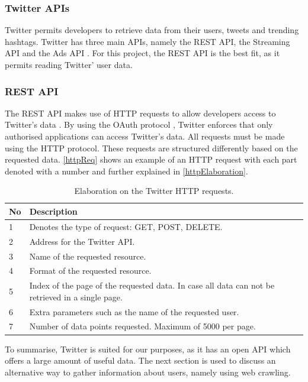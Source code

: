 \subsubsection{Twitter \acp{API}} \label{sub:twitterapi}
Twitter permits developers to retrieve data from their users, tweets and
trending hashtags. Twitter has three main \acp{API}, namely the \ac{REST}
\ac{API}, the Streaming \ac{API} and the Ads \ac{API} \citep{TwitterDevDocs}.
For this project, the \ac{REST} \ac{API} is the best fit, as it permits reading
Twitter' user data. 

\subsubsection{REST API}
The \ac{REST} \ac{API} makes use of \ac{HTTP} requests to allow developers
access to Twitter's data \citep{TwitterREST}. By using the OAuth protocol
\citep{TwitterOAuth}, Twitter enforces that only authorised applications can
access Twitter's data. All requests must be made using the \ac{HTTP} protocol.
These requests are structured differently based on the requested data.
\autoref{httpReq} shows an example of an \ac{HTTP} request with each part
denoted with a number and further explained in \autoref{httpElaboration}.


\begin{table}[H] 
\begin{centering}
\begin{tabular}{|l|p{9cm}|l|}
\hline
\textbf{No}&	\textbf{Description}										\\\hline
1			&	Denotes the type of request: GET, POST, DELETE.				\\\hline
2			&	Address for the Twitter \ac{API}.							\\\hline
3			&	Name of the requested resource.	   							\\\hline
4			&	Format of the requested resource.							\\\hline
5			&	Index of the page of the requested data. In case all data can not be
retrieved in a single page.													\\\hline 
6			&	Extra parameters such as the name of the requested user.	\\\hline
7			&	Number of data points requested. Maximum of 5000 per page.	\\\hline
\end{tabular}
\caption{Elaboration on the Twitter HTTP requests.}
\label{httpElaboration}
\end{centering}
\end{table}

To summarise, Twitter is suited for our purposes, as it has an open API which
offers a large amount of useful data. The next section is used to discuss an
alternative way to gather information about users, namely using web crawling.
